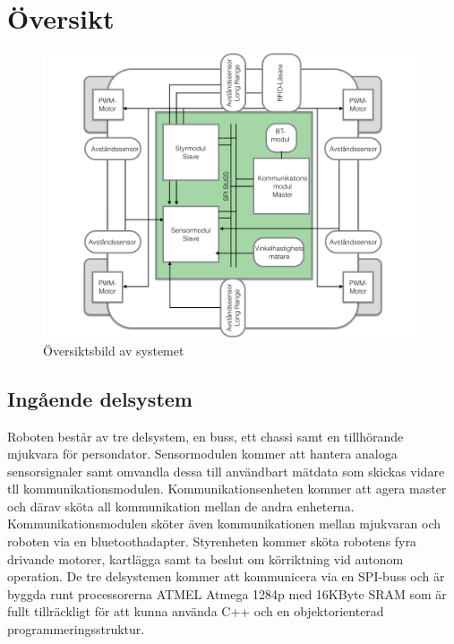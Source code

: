 \documentclass[a4paper,12pt,fleqn]{article}
\begin{document}
\addto\captionsswedish{\renewcommand{\contentsname}{Innehållsförteckning}}

\tableofcontents
\thispagestyle{fancy}
\newpage

\section{Översikt}

\begin{figure}[htp] %
  \begin{center}
  \includegraphics[keepaspectratio=true,width=\linewidth]{overview}  %
  \end{center}
  \caption{Översiktsbild av systemet} %
  \label{fig:overview}
\end{figure}

\subsection{Ingående delsystem}
Roboten består av tre delsystem, en buss, ett chassi samt en tillhörande mjukvara för persondator. Sensormodulen kommer att hantera analoga sensorsignaler samt omvandla dessa till användbart mätdata som skickas vidare tll kommunikationsmodulen. 
Kommunikationsenheten kommer att agera master och därav sköta all kommunikation mellan de andra enheterna. Kommunikationsmodulen sköter även kommunikationen mellan mjukvaran och roboten via en bluetoothadapter. Styrenheten kommer sköta robotens fyra drivande motorer, kartlägga samt ta beslut om körriktning vid autonom operation.
De tre delsystemen kommer att kommunicera via en SPI-buss och är byggda runt processorerna ATMEL Atmega 1284p med 16KByte SRAM som är fullt tillräckligt för att kunna använda C++ och en objektorienterad programmeringsstruktur.
\end{document}
